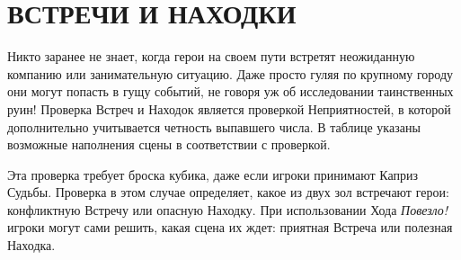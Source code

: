 \section{ВСТРЕЧИ И НАХОДКИ}
Никто заранее не знает, когда герои на своем пути встретят неожиданную компанию или занимательную ситуацию. Даже просто гуляя по крупному городу они могут попасть в гущу событий, не говоря уж об исследовании таинственных руин!
\newline Проверка Встреч и Находок является проверкой Неприятностей, в которой дополнительно учитывается четность выпавшего числа. В таблице указаны возможные наполнения сцены в соответствии с проверкой.
\begin{tcolorbox}
Эта проверка требует броска кубика, даже если игроки принимают Каприз Судьбы. Проверка в этом случае определяет, какое из двух зол встречают герои: конфликтную Встречу или опасную Находку.
\newline При использовании Хода \textit{Повезло!} игроки могут сами решить, какая сцена их ждет: приятная Встреча или полезная Находка.
\end{tcolorbox}
